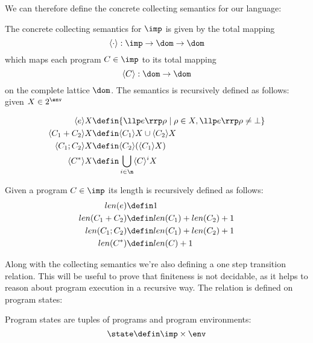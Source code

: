 We can therefore define the concrete collecting semantics for our
language:

\begin{definition}
  The concrete collecting semantics for \(\imp\) is given by the total
  mapping \[\langle \cdot \rangle : \imp \to \dom \to \dom\] which
  maps each program \(C \in \imp\) to its total mapping \[\langle C
  \rangle : \dom \to \dom\] on the complete lattice \(\dom\). The
  semantics is recursively defined as follows: given \(X \in 2^\env\)

  \begin{align*}
    \langle e \rangle X & \defin \{\llp e \rrp \rho \mid \rho \in X,
    \llp e \rrp \rho \neq \bot\} \\
    \langle C_1 + C_2 \rangle X & \defin \langle C_1 \rangle X \cup
    \langle C_2 \rangle X \\
    \langle C_1 ; C_2 \rangle X & \defin \langle C_2 \rangle (\langle
    C_1 \rangle X) \\
    \langle C^* \rangle X & \defin \bigcup_{i \in \n} \langle C \rangle^i X
  \end{align*}
\end{definition}

\begin{definition}
  Given a program \(C\in\imp\) its length is recursively defined as
  follows:
  \begin{align*}
    len(e)         & \defin 1 \\
    len(C_1 + C_2) & \defin len(C_1) + len(C_2) + 1 \\
    len(C_1;C_2)   & \defin len(C_1) + len(C_2) + 1 \\
    len(C^*)       & \defin len(C) + 1
  \end{align*}
\end{definition}

Along with the collecting semantics we're also defining a one step
transition relation. This will be useful to prove that finiteness is
not decidable, as it helps to reason about program execution in a
recursive way. The relation is defined on program states:

\begin{definition}
  Program states are tuples of programs and program
  environments: \[\state \defin \imp \times \env\]
\end{definition}

